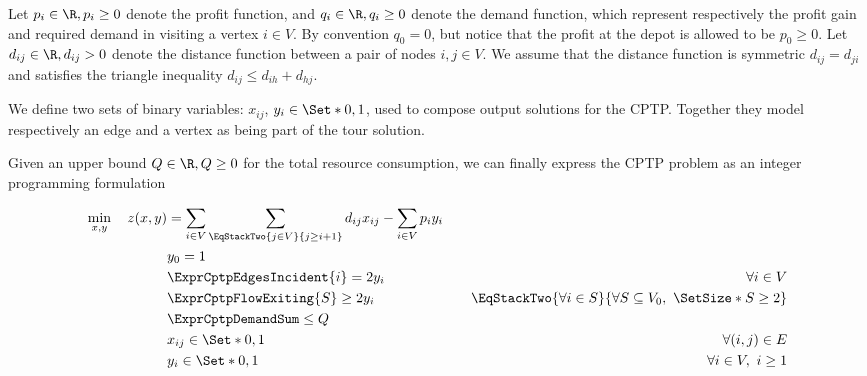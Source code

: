 Let $p_{i} \in \R, p_{i} \ge 0$ denote the profit function, and $q_{i} \in \R, q_{i} \ge 0$ denote the demand function, which represent respectively the profit gain and required demand in visiting a vertex $i \in V$.
By convention $q_0 = 0$, but notice that the profit at the depot is allowed to be $p_0 \ge 0$.
Let $d_{ij} \in \R, d_{ij} > 0$ denote the distance function between a pair of nodes  $i, j \in V$.
We assume that the distance function is symmetric $d_{ij} = d_{ji}$ and satisfies the triangle inequality $d_{ij} \le d_{ih} + d_{hj}$.

We define two sets of binary variables: $x_{ij}$, $y_{i} \in \Set*{0, 1}$, used to compose output solutions for the CPTP.
Together they model respectively an edge and a vertex as being part of the tour solution.

Given an upper bound $Q \in \R,Q \ge 0$ for the total resource consumption, we can finally express the CPTP problem as an integer programming formulation

\begin{align}
	\min_{x,y} \quad z(x, y) & =  \sum_{i \in V} \sum_{\EqStackTwo{j \in V}{j \ge i + 1}} d_{ij} x_{ij} - \sum_{i \in V} p_i y_i \label{eq:obj-function}                                                                                                                \\
	                         & y_0 = 1                                                                                                                   & \label{eq:depot-part-of-tour-constraint}                                                                     \\
	                         & \ExprCptpEdgesIncident{i}  = 2 y_i                                                                                        & \quad \forall i \in V         \label{eq:flow-conservation-constraint}                                        \\
	                         & \ExprCptpFlowExiting{S} \ge 2 y_{i}                                                                                       & \quad \EqStackTwo{\forall i \in S}{\forall S \subseteq V_0,\ \SetSize*{S} \ge 2} \label{eq:gsec-constraints} \\
	                         & \ExprCptpDemandSum  \le Q                                                                                                 & \label{eq:resource-upper-bound-constraint}                                                                   \\
	                         & x_{ij}                   \in \Set*{0, 1}                                                                                  & \quad \forall (i, j) \in E               \label{eq:x-mip-var-bounds}                                         \\
	                         & y_{i}                    \in \Set*{0, 1}                                                                                  & \quad \forall i \in V,\ i \ge 1          \label{eq:y-mip-var-bounds}
\end{align}


